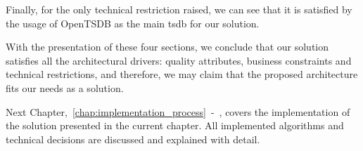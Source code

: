 


Finally, for the only technical restriction raised, we can see that it is satisfied by the usage of OpenTSDB as the main \gls{tsdb} for our solution.

With the presentation of these four sections, we conclude that our solution satisfies all the architectural drivers: quality attributes, business constraints and technical restrictions, and therefore, we may claim that the proposed architecture fits our needs as a solution.

Next Chapter,~\ref{chap:implementation_process}~-~, covers the implementation of the solution presented in the current chapter. All implemented algorithms and technical decisions are discussed and explained with detail.

\checkoddpage
{}
{ %
    \newpage
    \blankpage}
{ %
}